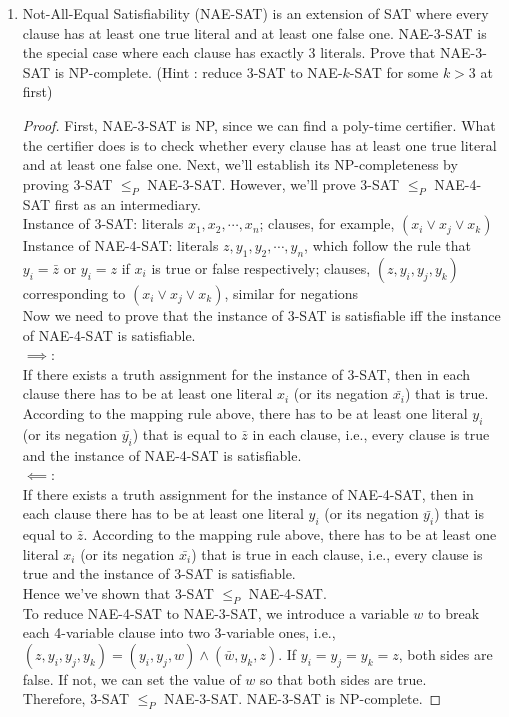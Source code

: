 \documentclass[12pt,a4paper]{article}
\theoremstyle{definition}
\begin{document}
\begin{enumerate}
	\item Not-All-Equal Satisfiability (NAE-SAT) is an extension of SAT where every clause has at least one true literal and at least one false one. NAE-$3$-SAT is the special case where each clause has exactly $3$ literals. Prove that NAE-$3$-SAT is NP-complete. (Hint : reduce $3$-SAT to NAE-$k$-SAT for some $k > 3$ at first)
	\begin{proof}
        First, NAE-3-SAT is NP, since we can find a poly-time certifier. What the certifier does is to check whether every clause has at least one true literal and at least one false one. Next, we'll establish its NP-completeness by proving 3-SAT $\leq _P$ NAE-3-SAT. However, we'll prove 3-SAT $\leq _P$ NAE-4-SAT first as an intermediary. \\
        Instance of 3-SAT: literals $x_1, x_2, \cdots , x_n$; clauses, for example, $(x_i \vee x_j \vee x_k)$ \\
        Instance of NAE-4-SAT: literals $z, y_1, y_2, \cdots , y_n$, which follow the rule that $y_i = \bar{z}$ or $y_i = z$ if $x_i$ is true or false respectively; clauses, $(z, y_i, y_j, y_k)$ corresponding to $(x_i \vee x_j \vee x_k)$, similar for negations  \\
        Now we need to prove that the instance of 3-SAT is satisfiable iff the instance of NAE-4-SAT is satisfiable. \\
        $\implies$: \\
        If there exists a truth assignment for the instance of 3-SAT, then in each clause there has to be at least one literal $x_i$ (or its negation $\bar{x_i}$) that is true. According to the mapping rule above, there has to be at least one literal $y_i$ (or its negation $\bar{y_i}$) that is equal to $\bar{z}$ in each clause, i.e., every clause is true and the instance of NAE-4-SAT is satisfiable. \\
        $\impliedby$: \\
        If there exists a truth assignment for the instance of NAE-4-SAT, then in each clause there has to be at least one literal $y_i$ (or its negation $\bar{y_i}$) that is equal to $\bar{z}$. According to the mapping rule above, there has to be at least one literal $x_i$ (or its negation $\bar{x_i}$) that is true in each clause, i.e., every clause is true and the instance of 3-SAT is satisfiable. \\
        Hence we've shown that 3-SAT $\leq _P$ NAE-4-SAT. \\
        To reduce NAE-4-SAT to NAE-3-SAT, we introduce a variable $w$ to break each 4-variable clause into two 3-variable ones, i.e., $(z, y_i, y_j, y_k) = (y_i, y_j, w) \wedge (\bar{w}, y_k, z)$. If $y_i = y_j = y_k = z$, both sides are false. If not, we can set the value of $w$ so that both sides are true. \\
        Therefore, 3-SAT $\leq _P$ NAE-3-SAT. NAE-3-SAT is NP-complete.
    \end{proof}


\end{enumerate}
\end{document}
